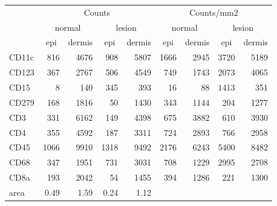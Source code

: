 \begin{tabular}{lrrrr|rrrr}
   \hline
 
         \multicolumn{1}{c}{} & \multicolumn{4}{c|}{Counts} & \multicolumn{4}{c}{Counts/mm2} \\ 
         \multicolumn{1}{c}{} & \multicolumn{2}{c}{normal} & \multicolumn{2}{c|}{lesion} & \multicolumn{2}{c}{normal} & \multicolumn{2}{c}{lesion}  \\ 
         \multicolumn{1}{c}{} & \multicolumn{1}{c}{epi} & dermis & \multicolumn{1}{c}{epi} & \multicolumn{1}{c|}{dermis} & \multicolumn{1}{c}{epi} & dermis & \multicolumn{1}{c}{epi} & dermis  \\ 
         \hline
    CD11c & 816 & 4676 & 908 & 5807 & 1666 & 2945 & 3720 & 5189 \\ 
  CD123 & 367 & 2767 & 506 & 4549 & 749 & 1743 & 2073 & 4065 \\ 
  CD15 & 8 & 140 & 345 & 393 & 16 & 88 & 1413 & 351 \\ 
  CD279 & 168 & 1816 & 50 & 1430 & 343 & 1144 & 204 & 1277 \\ 
  CD3 & 331 & 6162 & 149 & 4398 & 675 & 3882 & 610 & 3930 \\ 
  CD4 & 355 & 4592 & 187 & 3311 & 724 & 2893 & 766 & 2958 \\ 
  CD45 & 1066 & 9910 & 1318 & 9492 & 2176 & 6243 & 5400 & 8482 \\ 
  CD68 & 347 & 1951 & 731 & 3031 & 708 & 1229 & 2995 & 2708 \\ 
  CD8a & 193 & 2042 & 54 & 1455 & 394 & 1286 & 221 & 1300 \\ 
  area & 0.49 & 1.59 & 0.24 & 1.12 &    &    &    &    \\ 
   \hline
\end{tabular}

